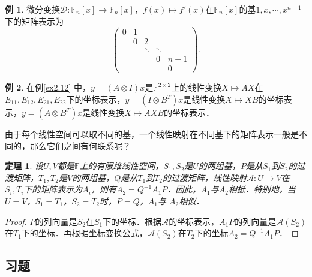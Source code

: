 \documentclass[a4paper,fontset=windows]{ctexbook}
\newtheorem{theorem}{定理}[chapter]
\theoremstyle{definition}
\newtheorem{example}{例}[chapter]
\begin{document}
\begin{example}
微分变换$\mathcal{D}:\mathbb{F}_n[x]\to\mathbb{F}_n[x]$，$f(x)\mapsto f'(x)$在$\mathbb{F}_n[x]$的基$1,x,\cdots,x^{n-1}$下的矩阵表示为
$$\begin{pmatrix}0&1&&& \\ &0&2&& \\ &&\ddots&\ddots& \\ &&&0&n-1 \\ &&&&0\end{pmatrix}.$$
\end{example}

\begin{example}
在例\ref{ex2.12} 中，$y=(A\otimes I)x$是$\mathbb{F}^{2\times 2}$上的线性变换$X\mapsto AX$在$E_{11},E_{12},E_{21},E_{22}$下的坐标表示，$y=(I\otimes B^T)x$是线性变换$X\mapsto XB$的坐标表示，$y=(A\otimes B^T)x$是线性变换$X\mapsto AXB$的坐标表示．
\end{example}

由于每个线性空间可以取不同的基，一个线性映射在不同基下的矩阵表示一般是不同的，那么它们之间有何联系呢？

\begin{theorem}\label{thm9.3}
设$U,V$都是$\mathbb{F}$上的有限维线性空间，$S_1,S_2$是$U$的两组基，$P$是从$S_1$到$S_2$的过渡矩阵，$T_1,T_2$是$V$的两组基，$Q$是从$T_1$到$T_2$的过渡矩阵，线性映射$\mathcal{A}:U\to V$在$S_i,T_i$下的矩阵表示为$A_i$，则有$A_2=Q^{-1}A_1P$．因此，$A_1$与$A_2$相抵．特别地，当$U=V$，$S_1=T_1$，$S_2=T_2$时，$P=Q$，$A_1$与 $A_2$相似．
\end{theorem}

\begin{proof}
$P$的列向量是$S_2$在$S_1$下的坐标．根据$\mathcal{A}$的坐标表示，$A_1P$的列向量是$\mathcal{A}(S_2)$在$T_1$下的坐标．再根据坐标变换公式，$\mathcal{A}(S_2)$在$T_2$下的坐标$A_2=Q^{-1}A_1P$．
\end{proof}

\subsection*{习题}
\end{document}
